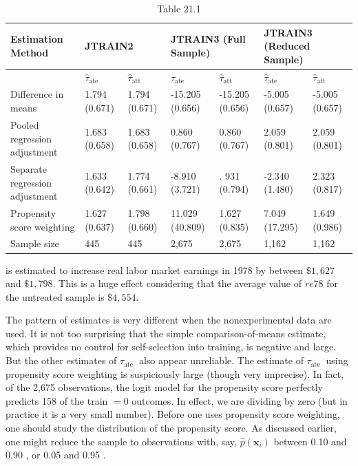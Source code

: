 \documentclass[10pt]{article}
\begin{document}
\begin{table}[h]
\begin{center}
\captionsetup{labelformat=empty}
\caption{Table 21.1}
\begin{tabular}{|l|l|l|l|l|l|l|}
\hline
\multirow[b]{2}{*}{Estimation Method} & \multicolumn{2}{|l|}{JTRAIN2} & \multicolumn{2}{|l|}{JTRAIN3 (Full Sample)} & \multicolumn{2}{|l|}{JTRAIN3 (Reduced Sample)} \\
\hline
 & $\hat{\tau}_{\text {ate }}$ & $\hat{\tau}_{\text {att }}$ & $\hat{\tau}_{\text {ate }}$ & $\hat{\tau}_{\text {att }}$ & $\hat{\tau}_{\text {ate }}$ & $\hat{\tau}_{\text {att }}$ \\
\hline
Difference in means & 1.794 (0.671) & 1.794 (0.671) & -15.205 (0.656) & -15.205 (0.656) & -5.005 (0.657) & -5.005 (0.657) \\
\hline
Pooled regression adjustment & 1.683 (0.658) & 1.683 (0.658) & 0.860 (0.767) & 0.860 (0.767) & 2.059 (0.801) & 2.059 (0.801) \\
\hline
Separate regression adjustment & 1.633 (0.642) & 1.774 (0.661) & -8.910 (3.721) & . 931 (0.794) & -2.340 (1.480) & 2.323 (0.817) \\
\hline
Propensity score weighting & 1.627 (0.637) & 1.798 (0.660) & 11.029 (40.809) & 1.627 (0.835) & 7.049 (17.295) & 1.649 (0.986) \\
\hline
Sample size & 445 & 445 & 2,675 & 2,675 & 1,162 & 1,162 \\
\hline
\end{tabular}
\end{center}
\end{table}

is estimated to increase real labor market earnings in 1978 by between $\$ 1,627$ and $\$ 1,798$. This is a huge effect considering that the average value of $r e 78$ for the untreated sample is $\$ 4,554$.

The pattern of estimates is very different when the nonexperimental data are used. It is not too surprising that the simple comparison-of-means estimate, which provides no control for self-selection into training, is negative and large. But the other estimates of $\tau_{\text {ate }}$ also appear unreliable. The estimate of $\tau_{\text {ate }}$ using propensity score weighting is suspiciously large (though very imprecise). In fact, of the 2,675 observations, the logit model for the propensity score perfectly predicts 158 of the train $=0$ outcomes. In effect, we are dividing by zero (but in practice it is a very small number). Before one uses propensity score weighting, one should study the distribution of the propensity score. As discussed earlier, one might reduce the sample to observations with, say, $\hat{p}\left(\mathbf{x}_{i}\right)$ between 0.10 and 0.90 , or 0.05 and 0.95 .
\end{document}
